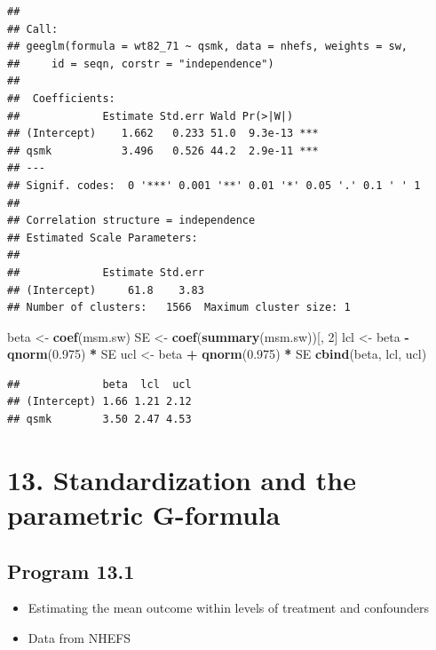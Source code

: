 \documentclass[
  10pt,
]{book}
\newenvironment{Shaded}{\begin{snugshade}}{\end{snugshade}}
\newcommand{\DecValTok}[1]{\textcolor[rgb]{0.00,0.00,0.81}{#1}}
\newcommand{\FloatTok}[1]{\textcolor[rgb]{0.00,0.00,0.81}{#1}}
\newcommand{\KeywordTok}[1]{\textcolor[rgb]{0.13,0.29,0.53}{\textbf{#1}}}
\newcommand{\NormalTok}[1]{#1}
\newcommand{\OperatorTok}[1]{\textcolor[rgb]{0.81,0.36,0.00}{\textbf{#1}}}
\newcommand{\StringTok}[1]{\textcolor[rgb]{0.31,0.60,0.02}{#1}}
\providecommand{\tightlist}{%
  \setlength{\itemsep}{0pt}\setlength{\parskip}{0pt}}
\begin{document}
\begin{verbatim}
## 
## Call:
## geeglm(formula = wt82_71 ~ qsmk, data = nhefs, weights = sw, 
##     id = seqn, corstr = "independence")
## 
##  Coefficients:
##             Estimate Std.err Wald Pr(>|W|)    
## (Intercept)    1.662   0.233 51.0  9.3e-13 ***
## qsmk           3.496   0.526 44.2  2.9e-11 ***
## ---
## Signif. codes:  0 '***' 0.001 '**' 0.01 '*' 0.05 '.' 0.1 ' ' 1
## 
## Correlation structure = independence 
## Estimated Scale Parameters:
## 
##             Estimate Std.err
## (Intercept)     61.8    3.83
## Number of clusters:   1566  Maximum cluster size: 1
\end{verbatim}

\begin{Shaded}
\begin{Highlighting}[]
\NormalTok{beta <-}\StringTok{ }\KeywordTok{coef}\NormalTok{(msm.sw)}
\NormalTok{SE <-}\StringTok{ }\KeywordTok{coef}\NormalTok{(}\KeywordTok{summary}\NormalTok{(msm.sw))[, }\DecValTok{2}\NormalTok{]}
\NormalTok{lcl <-}\StringTok{ }\NormalTok{beta }\OperatorTok{-}\StringTok{ }\KeywordTok{qnorm}\NormalTok{(}\FloatTok{0.975}\NormalTok{) }\OperatorTok{*}\StringTok{ }\NormalTok{SE}
\NormalTok{ucl <-}\StringTok{ }\NormalTok{beta }\OperatorTok{+}\StringTok{ }\KeywordTok{qnorm}\NormalTok{(}\FloatTok{0.975}\NormalTok{) }\OperatorTok{*}\StringTok{ }\NormalTok{SE}
\KeywordTok{cbind}\NormalTok{(beta, lcl, ucl)}
\end{Highlighting}
\end{Shaded}

\begin{verbatim}
##             beta  lcl  ucl
## (Intercept) 1.66 1.21 2.12
## qsmk        3.50 2.47 4.53
\end{verbatim}

\hypertarget{standardization-and-the-parametric-g-formula}{%
\chapter*{13. Standardization and the parametric G-formula}\label{standardization-and-the-parametric-g-formula}}

\hypertarget{program-13.1}{%
\section{Program 13.1}\label{program-13.1}}

\begin{itemize}
\tightlist
\item
  Estimating the mean outcome within levels of treatment and confounders
\item
  Data from NHEFS
\end{itemize}
\end{document}
